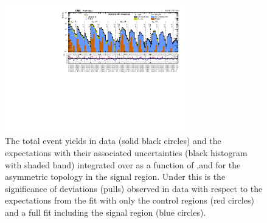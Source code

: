 \begin{figure}[!h]
  \begin{center}
    \includegraphics[angle=90,width=0.7\textwidth]{figs/analysis/results/summaryPlot_Asymmetric_prefit_overlay_fit_b}
    \caption{The total event yields in data (solid black circles)
      and the \SM expectations with their associated uncertainties (black
      histogram with shaded band) integrated over \MHT as a function of
      \nj,\nb and \HT for the asymmetric topology in the
      signal region. Under this is the significance of deviations
      (pulls) observed in data with respect to the \SM expectations
      from the fit with only the control regions (red circles) and a
      full fit including the signal region (blue circles).}
    \label{fig:asym}
  \end{center}
\end{figure}

